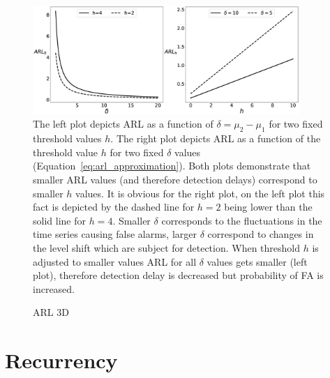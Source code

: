 \begin{figure}[!htb]
	\centering
	\includegraphics[width=0.9\textwidth]{images/images_ecmplpkdd/arl.eps}
	\caption{
    The left plot depicts ARL as a function of $\delta = \mu_2-\mu_1$ for two fixed threshold values $h$. The right plot depicts ARL as a function of the threshold value $h$ for two fixed $\delta$ values (Equation~\ref{eq:arl_approximation}).
    Both plots demonstrate that smaller ARL values (and therefore detection delays) correspond to smaller $h$ values. It is obvious for the right plot, on the left plot this fact is depicted by the dashed line for $h=2$ being lower than the solid line for $h=4$.
    Smaller $\delta$ corresponds to the fluctuations in the time series causing false alarms, larger $\delta$ correspond to changes in the level shift which are subject for detection.
    When threshold $h$ is adjusted to smaller values ARL for all $\delta$ values gets smaller (left plot), therefore detection delay is decreased but probability of FA is increased.
}\label{fig:arl}
\end{figure}
\begin{figure}[!htb]

\caption{ARL 3D}\label{fig:arl3d}
\end{figure}


\section{Recurrency}

